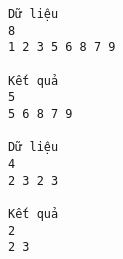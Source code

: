 \begin{verbatim}
Dữ liệu
8
1 2 3 5 6 8 7 9

Kết quả
5
5 6 8 7 9

Dữ liệu
4
2 3 2 3

Kết quả
2
2 3
\end{verbatim}